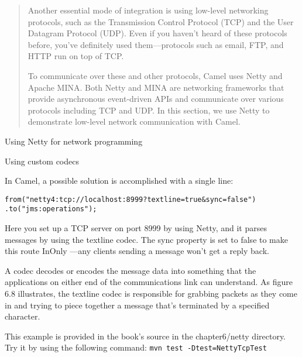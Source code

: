 \documentclass[Screen16to9,17pt]{foils}
\begin{document}

\begin{quote}
  Another essential mode of integration is using
low-­level networking protocols, such as the Transmission Control Protocol (TCP)
and the User Datagram Protocol (UDP). Even if you haven’t heard of these protocols
before, you’ve definitely used them—protocols such as email, FTP, and HTTP run on
top of TCP.

To communicate over these and other protocols, Camel uses Netty and Apache
MINA. Both Netty and MINA are networking frameworks that provide asynchronous
event-­driven APIs and communicate over various protocols including TCP and UDP.
In this section, we use Netty to demonstrate low-­level network communication with
Camel.
\end{quote}

\begin{list2}
\item Using Netty for network programming
\item Using custom codecs
\end{list2}



In Camel, a possible solution is accomplished with a single line:
\begin{verbatim}
from("netty4:tcp://localhost:8999?textline=true&sync=false")
.to("jms:operations");
\end{verbatim}

Here you set up a TCP server on port 8999 by using Netty, and it parses messages
by using the textline codec. The sync property is set to false to make this route
InOnly —any clients sending a message won’t get a reply back.




A codec decodes or encodes the message data into something that the applications
on either end of the communications link can understand. As figure 6.8 illustrates, the
textline codec is responsible for grabbing packets as they come in and trying to piece
together a message that’s terminated by a specified character.

This example is provided in the book’s source in the chapter6/netty directory. Try it by using the following command:
\verb+mvn test -Dtest=NettyTcpTest+
\end{document}
